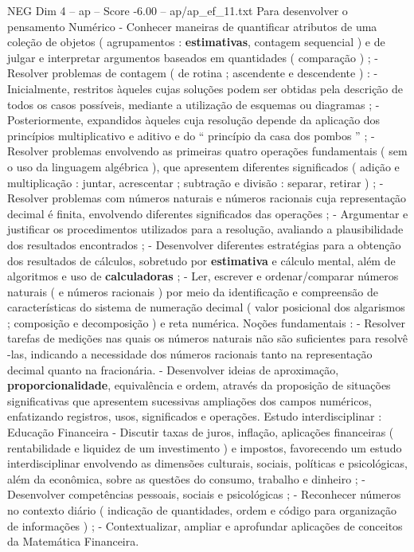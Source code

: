 \begin{textsample}{NEG Dim 4 – ap – Score -6.00 – ap/ap\_ef\_11.txt}
Para desenvolver o pensamento Numérico - Conhecer maneiras de quantificar atributos de uma coleção de objetos ( agrupamentos : \textbf{estimativas}, contagem sequencial ) e de julgar e interpretar argumentos baseados em quantidades ( comparação ) ; - Resolver problemas de contagem ( de rotina ; ascendente e descendente ) : - Inicialmente, restritos àqueles cujas soluções podem ser obtidas pela descrição de todos os casos possíveis, mediante a utilização de esquemas ou diagramas ; - Posteriormente, expandidos àqueles cuja resolução depende da aplicação dos princípios multiplicativo e aditivo e do “ princípio da casa dos pombos ” ; - Resolver problemas envolvendo as primeiras quatro operações fundamentais ( sem o uso da linguagem algébrica ), que apresentem diferentes significados ( adição e multiplicação : juntar, acrescentar ; subtração e divisão : separar, retirar ) ; - Resolver problemas com números naturais e números racionais cuja representação decimal é finita, envolvendo diferentes significados das operações ; - Argumentar e justificar os procedimentos utilizados para a resolução, avaliando a plausibilidade dos resultados encontrados ; - Desenvolver diferentes estratégias para a obtenção dos resultados de cálculos, sobretudo por \textbf{estimativa} e cálculo mental, além de algoritmos e uso de \textbf{calculadoras} ; - Ler, escrever e ordenar/comparar números naturais ( e números racionais ) por meio da identificação e compreensão de características do sistema de numeração decimal ( valor posicional dos algarismos ; composição e decomposição ) e reta numérica.
Noções fundamentais : - Resolver tarefas de medições nas quais os números naturais não são suficientes para resolvê -las, indicando a necessidade dos números racionais tanto na representação decimal quanto na fracionária. - Desenvolver ideias de aproximação, \textbf{proporcionalidade}, equivalência e ordem, através da proposição de situações significativas que apresentem sucessivas ampliações dos campos numéricos, enfatizando registros, usos, significados e operações.
Estudo interdisciplinar : Educação Financeira - Discutir taxas de juros, inflação, aplicações financeiras ( rentabilidade e liquidez de um investimento ) e impostos, favorecendo um estudo interdisciplinar envolvendo as dimensões culturais, sociais, políticas e psicológicas, além da econômica, sobre as questões do consumo, trabalho e dinheiro ; - Desenvolver competências pessoais, sociais e psicológicas ; - Reconhecer números no contexto diário ( indicação de quantidades, ordem e código para organização de informações ) ; - Contextualizar, ampliar e aprofundar aplicações de conceitos da Matemática Financeira.

\end{textsample}
